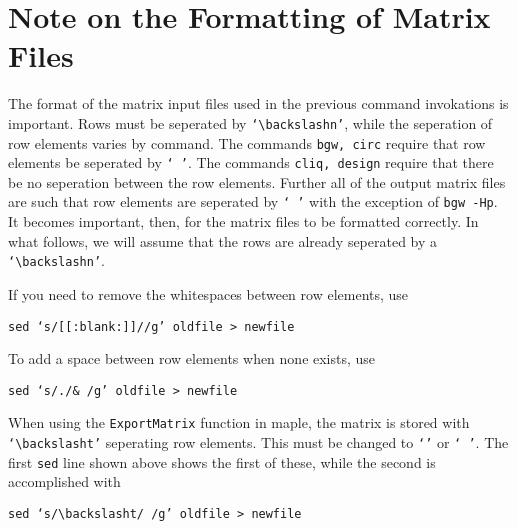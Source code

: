 \documentclass[a4paper,10pt]{article}
\begin{document}
\section{\centering\sc Note on the Formatting of Matrix Files}
The format of the matrix input files used in the previous command invokations is important. Rows must be seperated by {\tt `$\backslash$n'}, while the seperation of row elements varies by command. The commands {\tt bgw, circ} require that row elements be seperated by {\tt ` '}. The commands {\tt cliq, design} require that there be no seperation between the row elements. Further all of the output matrix files are such that row elements are seperated by {\tt ` '} with the exception of {\tt bgw -Hp}. It becomes important, then, for the matrix files to be formatted correctly. In what follows, we will assume that the rows are already seperated by a {\tt `$\backslash$n'}.

If you need to remove the whitespaces between row elements, use 
\begin{center}
{\tt sed `s/[[:blank:]]//g' oldfile > newfile}
\end{center}
To add a space between row elements when none exists, use
\begin{center}
{\centering\tt sed `s/./\& /g' oldfile > newfile}
\end{center}
When using the {\tt ExportMatrix} function in maple, the matrix is stored with {\tt `$\backslash$t'} seperating row elements. This must be changed to {\tt `'} or {\tt ` '}. The first {\tt sed} line shown above shows the first of these, while the second is accomplished with
\begin{center}
 {\tt sed `s/$\backslash$t/ /g' oldfile > newfile}
\end{center}
\end{document}

